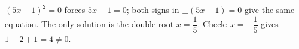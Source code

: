 $(5x-1)^2=0$ forces $5x-1=0$; both signs in $\pm(5x-1)=0$ give the same equation. The only solution is the double root $\boxed{x=\dfrac15}$. Check: $x=-\dfrac15$ gives $1+2+1=4\ne0$.

